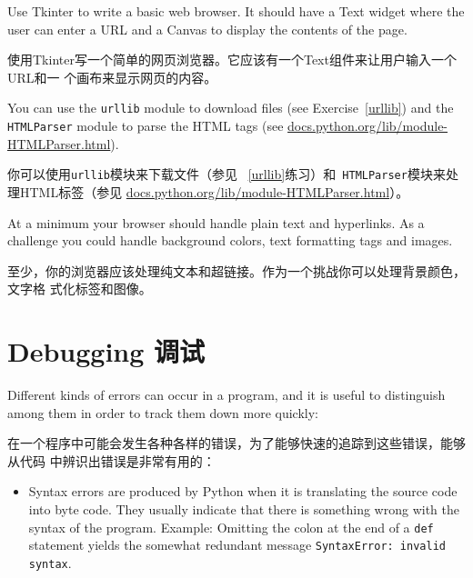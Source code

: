 \documentclass[10pt]{book}
\begin{document}
\begin{CJK}{UTF8}{gbsn}
\begin{exercise}
Use Tkinter to write a basic web browser.  It
should have a Text widget where the user can enter a URL
and a Canvas to display the contents of the page.

使用Tkinter写一个简单的网页浏览器。它应该有一个Text组件来让用户输入一个URL和一
个画布来显示网页的内容。

You can use the {\tt urllib} module to download files
(see Exercise~\ref{urllib}) and
the {\tt HTMLParser} module to parse the HTML
tags (see \url{docs.python.org/lib/module-HTMLParser.html}).

你可以使用{\tt urllib}模块来下载文件（参见 ~\ref{urllib}练习）和{\tt
HTMLParser}模块来处理HTML标签（参见
\url{docs.python.org/lib/module-HTMLParser.html}）。

At a minimum your browser should handle plain text and hyperlinks.  As
a challenge you could handle background colors, text
formatting tags and images.

至少，你的浏览器应该处理纯文本和超链接。作为一个挑战你可以处理背景颜色，文字格
式化标签和图像。


\end{exercise}



\appendix

\chapter{Debugging 调试}


Different kinds of errors can occur
in a program, and it is useful to distinguish among them
in order to track them down more quickly:

在一个程序中可能会发生各种各样的错误，为了能够快速的追踪到这些错误，能够从代码
中辨识出错误是非常有用的：

\begin{itemize}

\item Syntax errors are produced by Python when it is translating the
  source code into byte code.  They usually indicate that there is
  something wrong with the syntax of the program.  Example: Omitting
  the colon at the end of a {\tt def} statement yields the somewhat
  redundant message {\tt SyntaxError: invalid syntax}.


\end{itemize}
\end{CJK}
\end{document}
